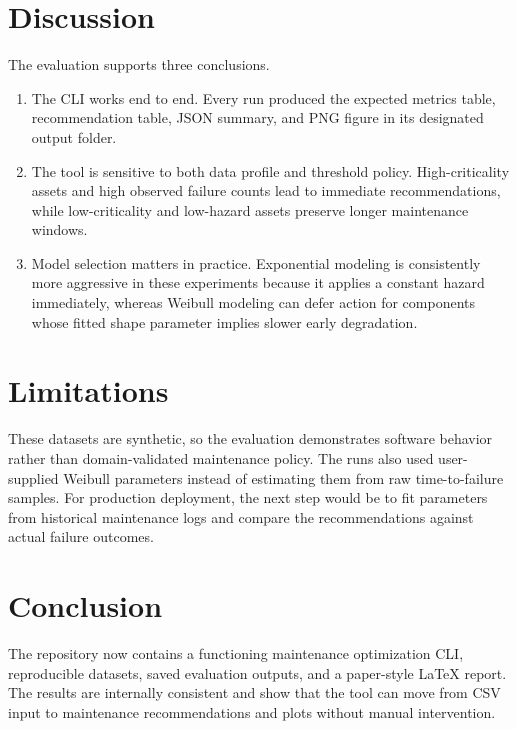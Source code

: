 \documentclass[11pt]{article}
\begin{document}
\section{Discussion}
The evaluation supports three conclusions.

\begin{enumerate}
\item The CLI works end to end. Every run produced the expected metrics table, recommendation table, JSON summary, and PNG figure in its designated output folder.
\item The tool is sensitive to both data profile and threshold policy. High-criticality assets and high observed failure counts lead to immediate recommendations, while low-criticality and low-hazard assets preserve longer maintenance windows.
\item Model selection matters in practice. Exponential modeling is consistently more aggressive in these experiments because it applies a constant hazard immediately, whereas Weibull modeling can defer action for components whose fitted shape parameter implies slower early degradation.
\end{enumerate}

\section{Limitations}
These datasets are synthetic, so the evaluation demonstrates software behavior rather than domain-validated maintenance policy. The runs also used user-supplied Weibull parameters instead of estimating them from raw time-to-failure samples. For production deployment, the next step would be to fit parameters from historical maintenance logs and compare the recommendations against actual failure outcomes.

\section{Conclusion}
The repository now contains a functioning maintenance optimization CLI, reproducible datasets, saved evaluation outputs, and a paper-style LaTeX report. The results are internally consistent and show that the tool can move from CSV input to maintenance recommendations and plots without manual intervention.
\end{document}
